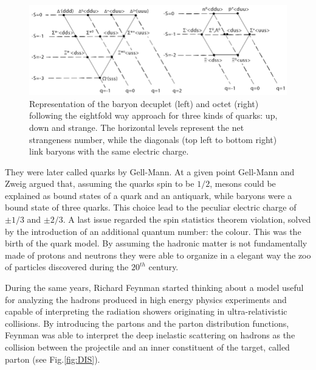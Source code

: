 \begin{figure}[!ht]
\begin{center}
\includegraphics[width=0.8\linewidth]{Chapters/Introduction/Figs/eightfold_way.png}
\caption{Representation of the baryon decuplet (left) and octet (right) following the eightfold way approach for three kinds of quarks: up, down and strange. The horizontal levels represent the net strangeness number, while the diagonals (top left to bottom right) link baryons with the same electric charge.}
\label{fig:gelmann}
\end{center}
\end{figure}

They were later called quarks by Gell-Mann.
At a given point Gell-Mann and Zweig argued that, assuming the quarks spin to be $1/2$, mesons could be explained as bound states of a quark and an antiquark, while baryons were a bound state of three quarks.
This choice lead to the peculiar electric charge of $\pm1/3$ and $\pm2/3$.
A last issue regarded the spin statistics theorem violation, solved by the introduction of an additional quantum number: the colour.
This was the birth of the quark model.
By assuming the hadronic matter is not fundamentally made of protons and neutrons they were able to organize in a elegant way the zoo of particles discovered during the $20^{th}$ century.

During the same years, Richard Feynman started thinking about a model useful for analyzing the hadrons produced in high energy physics experiments and capable of interpreting the radiation showers originating in ultra-relativistic collisions.
By introducing the partons and the parton distribution functions, Feynman was able to interpret the deep inelastic scattering on hadrons as the collision between the projectile and an inner constituent of the target, called parton (see Fig.\ref{fig:DIS}).

